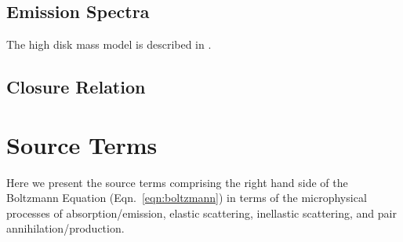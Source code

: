 \documentclass[aps,prd,twocolumn,superscriptaddress,groupedaddress]{revtex4}
\begin{document}
\subsection{Emission Spectra}
\label{ssec:spectra}

The high disk mass model is described in \cite{deat2013-leakage}.

\subsection{Closure Relation}
\label{ssec:closure}

\appendix

\section{Source Terms}
\label{sec:source_terms}
Here we present the source terms comprising the right hand side of the
Boltzmann Equation (Eqn.~\ref{eqn:boltzmann}) in terms of the microphysical
processes of absorption/emission, elastic scattering, inellastic scattering,
and pair annihilation/production.


\end{document}
